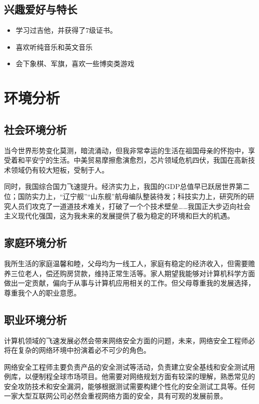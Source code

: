 \documentclass{article}
\begin{document}
\subsection{兴趣爱好与特长}

\begin{itemize}
    \item 学习过吉他，并获得了7级证书。
    \item 喜欢听纯音乐和英文音乐
    \item 会下象棋、军旗，喜欢一些博奕类游戏
\end{itemize}

\section{环境分析}

\subsection{社会环境分析}

当今世界形势变化莫测，暗流涌动，但我非常幸运的生活在祖国母亲的怀抱中，享受着和平安宁的生活。中美贸易摩擦愈演愈烈，芯片领域危机四伏，我国在高新技术领域仍有较大短板，受制于人。

同时，我国综合国力飞速提升。经济实力上，我国的GDP总值早已跃居世界第二位；国防实力上，“辽宁舰”“山东舰”航母编队整装待发；科技实力上，研究所的研究人员们攻克了一道道技术难关，打破了一个个技术壁垒……我国正大步迈向社会主义现代化强国，这为我未来的发展提供了极为稳定的环境和巨大的机遇。

\subsection{家庭环境分析}

我所生活的家庭温馨和睦，父母均为一线工人，家庭有稳定的经济收入，但需要赡养三位老人，偿还购房贷款，维持正常生活等。家人期望我能够对计算机科学方面做出一定贡献，偏向于从事与计算机应用相关的工作。但父母尊重我的发展选择，尊重我个人的职业意愿。

\subsection{职业环境分析}

计算机领域的飞速发展必然会带来网络安全方面的问题，未来，网络安全工程师必将在复杂的网络环境中扮演着必不可少的角色。

网络安全工程师主要负责产品的安全测试等活动，负责建立安全基线和安全测试用例库，以便制程全球市场项目。他需要对网络规划方面有较深的理解，熟悉常见的安全攻防技术和安全漏洞，能够根据测试需要构建个性化的安全测试工具等。任何一家大型互联网公司必然会重视网络方面的安全，具有可观的发展前景。
\end{document}
